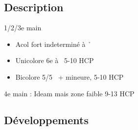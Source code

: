 \documentclass[a4paper]{article}
\begin{document}
\subsection{Description}

1/2/3e main

\begin{itemize}
\item Acol fort indeterminé à \h\ 

\item Unicolore 6e à \s\ 5-10 HCP 

\item Bicolore 5/5 \s\ + mineure, 5-10 HCP

\end{itemize}

\begin{bidtable}
4e \> main : Ideam mais zone faible 9-13 HCP
\end{bidtable}

\subsection{Développements}
\end{document}
